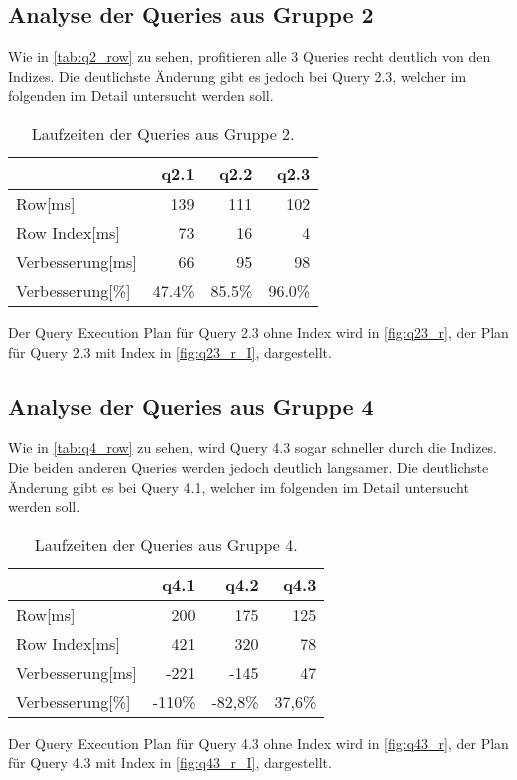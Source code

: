 \subsection{Analyse der Queries aus Gruppe 2}

Wie in \autoref{tab:q2_row} zu sehen, profitieren alle 3 Queries recht deutlich von den Indizes. 
Die deutlichste Änderung gibt es jedoch bei Query 2.3, welcher im folgenden im Detail untersucht werden soll.

\setlength\intextsep{0pt}
\begin{table}[H]
    \begin{tabularx}{\linewidth}{lrrr}
        \toprule
                        & q2.1  &	q2.2    &	q2.3 \\
        \toprule
        Row[ms]	        & 139	&	111	    &	102  \\
        Row Index[ms]   & 73	&   16	    &   4    \\
        Verbesserung[ms]  & 66    &   95      &   98   \\
        Verbesserung[\%]  & 47.4\%  &   85.5\%    &   96.0\% \\    
\bottomrule
\end{tabularx}
\caption{Laufzeiten der Queries aus Gruppe 2.}
\label{tab:q2_row}
\end{table}

Der Query Execution Plan für Query 2.3 ohne Index wird in \autoref{fig:q23_r}, der Plan für Query 2.3 mit Index in \autoref{fig:q23_r_I}, dargestellt.





\subsection{Analyse der Queries aus Gruppe 4}

Wie in \autoref{tab:q4_row} zu sehen, wird Query 4.3 sogar schneller durch die Indizes. 
Die beiden anderen Queries werden jedoch deutlich langsamer. Die deutlichste Änderung 
gibt es bei Query 4.1, welcher im folgenden im Detail untersucht werden soll.

\setlength\intextsep{0pt}
\begin{table}[H]
    \begin{tabularx}{\linewidth}{lrrr}
        \toprule
                        & q4.1      &	q4.2        &	q4.3       \\
        \toprule
        Row[ms]	        & 200	    &	175	        &	125        \\
        Row Index[ms]   & 421	    &   320	        &   78          \\
        Verbesserung[ms]  & -221      &   -145        &   47         \\
        Verbesserung[\%]  & -110\%    &   -82,8\%     &   37,6\%       \\    
\bottomrule
\end{tabularx}
\caption{Laufzeiten der Queries aus Gruppe 4.}
\label{tab:q4_row}
\end{table}

Der Query Execution Plan für Query 4.3 ohne Index wird in \autoref{fig:q43_r}, der Plan für Query 4.3 mit Index in \autoref{fig:q43_r_I}, dargestellt.



